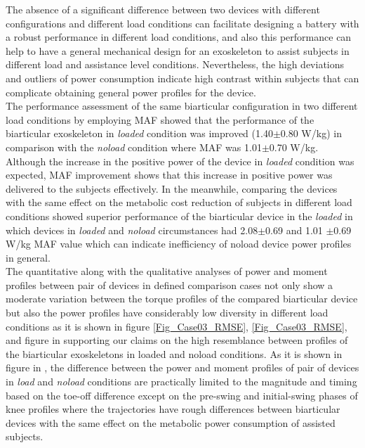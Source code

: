 \documentclass[10pt,letterpaper]{article}
\begin{document}
The absence of a significant difference between two devices with different configurations and different load conditions can facilitate designing a battery with a robust performance in different load conditions, and also this performance can help to have a general mechanical design for an exoskeleton to assist subjects in different load and assistance level conditions. Nevertheless, the high deviations and outliers of power consumption indicate high contrast within subjects that can complicate obtaining general power profiles for the device.\\
The performance assessment of the same biarticular configuration in two different load conditions by employing MAF showed that the performance of the biarticular exoskeleton in {\it loaded} condition was improved (1.40$\pm$0.80 W/kg) in comparison with the  {\it noload} condition where MAF was 1.01$\pm$0.70 W/kg. Although the increase in the positive power of the device in {\it loaded} condition was expected, MAF improvement shows that this increase in positive power was delivered to the subjects effectively. In the meanwhile, comparing the devices with the same effect on the metabolic cost reduction of subjects in different load conditions showed superior performance of the biarticular device in the {\it loaded} in which devices in {\it loaded} and {\it noload} circumstances had  2.08$\pm$0.69 and 1.01 $\pm$0.69 W/kg MAF value which can indicate inefficiency of noload device power profiles in general.\\
The quantitative along with the qualitative analyses of power and moment profiles between pair of devices in defined comparison cases not only show a moderate variation between the torque profiles of the compared biarticular device but also the power profiles have considerably low diversity in different load conditions as it is shown in figure \ref{Fig_Case03_RMSE}, \ref{Fig_Case03_RMSE}, and figure in  supporting our claims on the high resemblance between profiles of the biarticular exoskeletons in loaded and noload conditions. As it is shown in figure in , the difference between the power and moment profiles of pair of devices in {\it load} and {\it noload} conditions are practically limited to the magnitude and timing based on the toe-off difference except on the pre-swing and initial-swing phases of knee profiles where the trajectories have rough differences between biarticular devices with the same effect on the metabolic power consumption of assisted subjects.
\end{document}
